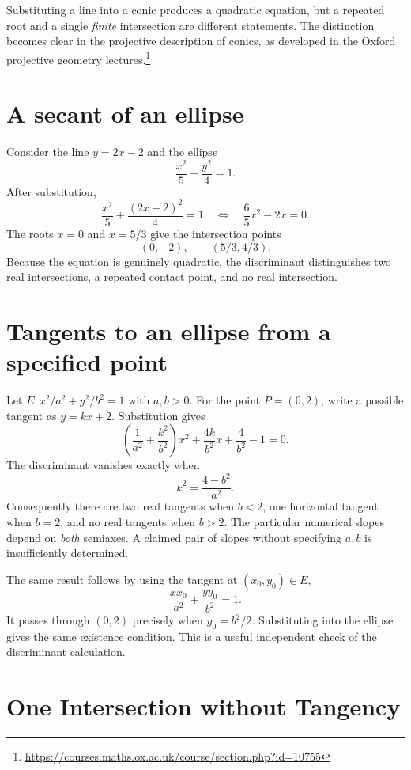 
Substituting a line into a conic produces a quadratic equation, but a repeated root and a single \emph{finite} intersection are different statements. The distinction becomes clear in the projective description of conics, as developed in the Oxford projective geometry lectures.\footnote{\url{https://courses.maths.ox.ac.uk/course/section.php?id=10755}}

\section{A secant of an ellipse}

Consider the line \(y=2x-2\) and the ellipse
\[
 \frac{x^2}{5}+\frac{y^2}{4}=1.
\]
After substitution,
\[
 \frac{x^2}{5}+\frac{(2x-2)^2}{4}=1
 \quad\Longleftrightarrow\quad
 \frac65x^2-2x=0.
\]
The roots \(x=0\) and \(x=5/3\) give the intersection points
\[
 (0,-2),\qquad (5/3,4/3).
\]
Because the equation is genuinely quadratic, the discriminant distinguishes two real intersections, a repeated contact point, and no real intersection.

\section{Tangents to an ellipse from a specified point}

Let \(E:x^2/a^2+y^2/b^2=1\) with \(a,b>0\). For the point \(P=(0,2)\), write a possible tangent as \(y=kx+2\). Substitution gives
\[
 \left(\frac1{a^2}+\frac{k^2}{b^2}\right)x^2
 +\frac{4k}{b^2}x+\frac4{b^2}-1=0.
\]
The discriminant vanishes exactly when
\[
 \boxed{k^2=\frac{4-b^2}{a^2}}.
\]
Consequently there are two real tangents when \(b<2\), one horizontal tangent when \(b=2\), and no real tangents when \(b>2\). The particular numerical slopes depend on \emph{both} semiaxes. A claimed pair of slopes without specifying \(a,b\) is insufficiently determined.

The same result follows by using the tangent at \((x_0,y_0)\in E\),
\[
 \frac{x x_0}{a^2}+\frac{y y_0}{b^2}=1.
\]
It passes through \((0,2)\) precisely when \(y_0=b^2/2\). Substituting into the ellipse gives the same existence condition. This is a useful independent check of the discriminant calculation.

\section{One Intersection without Tangency}

